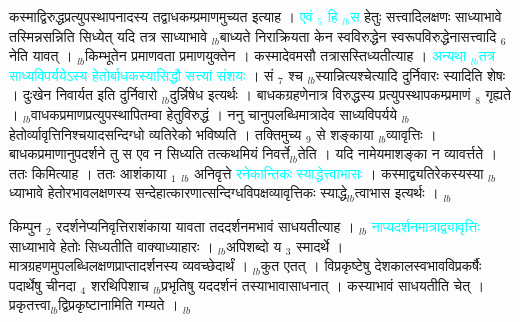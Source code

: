 \documentclass[article,12pt,a4paper]{memoir}%
\newcommand{\quotelemma}[1]{\textcolor{cyan}{#1}}
\newcounter{parCount}
\begin{document}
	  
	  \pstart \leavevmode%
	\hphantom{.}कस्माद्विरुद्धप्रत्युपस्थापनादस्य तद्वाधकम्प्रमाणमुच्यत इत्याह । \quotelemma{एवं {\tiny $_{5}$} हि {\tiny $_{lb}$}स} हेतुः सत्त्वादिलक्षणः साध्याभावे तस्मिन्नसन्निति सिध्येत् यदि तत्र साध्याभावे {\tiny $_{lb}$}बाध्यते निराक्रियता केन स्वविरुद्धेन स्वरूपविरुद्धेनासत्त्वादि {\tiny $_{6}$} नेति यावत् । {\tiny $_{lb}$}किम्भूतेन प्रमाणवता प्रमाणयुक्तेन । कस्मादेवमसौ तत्रासस्तिध्यतीत्याह । \quotelemma{अन्यथा {\tiny $_{lb}$}तत्र \cite[1b11]{vn-msN} साध्यविपर्ययेऽस्य हेतोर्बाधकस्यासिद्धौ सत्त्यां संशयः} । सं {\tiny $_{7}$} श्च {\tiny $_{lb}$}स्यान्नित्यश्चेत्यादि दुर्निवारः स्यादिति शेषः । दुःखेन निवार्यत इति दुर्निवारो {\tiny $_{lb}$}दुर्न्निषेध इत्यर्थः । बाधकग्रहणेनात्र विरुद्धस्य प्रत्युपस्थापकम्प्रमाणं {\tiny $_{8}$} गृह्यते । {\tiny $_{lb}$}वाधकप्रमाणप्रत्युपस्थापितम्वा हेतुविरुद्धं । ननु चानुपलब्धिमात्रादेव साध्यविपर्यये {\tiny $_{lb}$}हेतोर्व्यावृत्तिनिश्चयादसन्दिग्धो व्यतिरेको भविष्यति । तक्तिमुच्य {\tiny $_{9}$} \leavevmode{} से शङ्काया {\tiny $_{lb}$}व्यावृत्तिः । बाधकप्रमाणानुपदर्शने तु स एव न सिध्यति तत्कथमियं निवर्त्ते{\tiny $_{lb}$}तेति । यदि नामेयमाशङ्का न व्यावर्त्तते । ततः किमित्याह । ततः आशंकाया {\tiny $_{1}$} {\tiny $_{lb}$} \leavevmode{} अनिवृत्ते \quotelemma{रनेकान्तिकः स्याद्धेत्त्वाभासः} \cite[1b7]{vn-msN} । कस्माद्व्यतिरेकस्यस्या {\tiny $_{lb}$} ध्याभावे हेतोरभावलक्षणस्य सन्देहात्कारणात्सन्दिग्धविपक्षव्यावृत्तिकः स्याद्धे{\tiny $_{lb}$}त्वाभास इत्यर्थः ।
	{}
	\pend%
      {\tiny $_{lb}$}

	  
	  \pstart \leavevmode%
	किम्पुन {\tiny $_{2}$} रदर्शनेप्यनिवृत्तिराशंकाया यावता तददर्शनमभावं साधयतीत्याह । {\tiny $_{lb}$} \quotelemma{नाप्यदर्शनमात्राद्व्यावृत्तिः} \cite[1b7]{vn-msN} साध्याभावे हेतोः सिध्यतीति वाक्याध्याहारः । {\tiny $_{lb}$}अपिशब्दो य {\tiny $_{3}$} स्मादर्थे । मात्रग्रहणमुपलब्धिलक्षणप्राप्तादर्शनस्य व्यवच्छेदार्थं । {\tiny $_{lb}$}कुत एतत् । विप्रकृष्टेषु देशकालस्वभावविप्रकर्षैः पदार्थेषु चीनदा {\tiny $_{4}$} शरथिपिशाच {\tiny $_{lb}$}प्रभृतिषु यददर्शनं तस्याभावासाधनात् । कस्याभावं साधयतीति चेत् । प्रकृतत्त्वा{\tiny $_{lb}$}द्विप्रकृष्टानामिति गम्यते ।
	{}
	\pend%
      {\tiny $_{lb}$}
\end{document}
